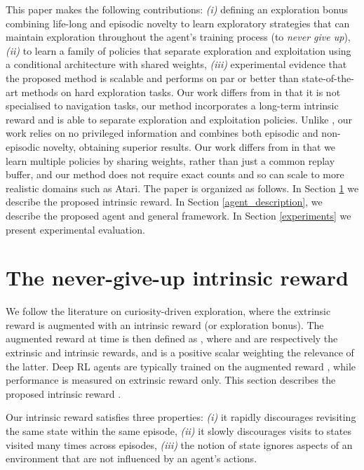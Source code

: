\documentclass{article} \usepackage{iclr2020_conference,times}
\begin{document}
This paper makes the following contributions: \emph{(i)} defining an exploration bonus combining life-long and episodic novelty to learn exploratory strategies that can maintain exploration throughout the agent's training process (to \emph{never give up}), \emph{(ii)} to learn a family of policies that separate exploration and exploitation using a conditional architecture with shared weights, \emph{(iii)} experimental evidence that the proposed method is scalable and performs on par or better than state-of-the-art methods on hard exploration tasks.
Our work differs from \citet{savinov2018episodic} in that it is not specialised to navigation tasks, our method incorporates a long-term intrinsic reward and is able to separate exploration and exploitation policies. Unlike \citet{stanton2018deep}, our work relies on no privileged information and combines both episodic and non-episodic novelty, obtaining superior results.
Our work differs from \citet{beyer2019mulex} in that we learn multiple policies by sharing weights, rather than just a common replay buffer, and our method does not require exact counts and so can scale to more realistic domains such as Atari.
The paper is organized as follows. In Section \ref{learning_exploratory} we describe the proposed intrinsic reward. In Section \ref{agent_description}, we describe the proposed agent and general framework. In Section \ref{experiments} we present experimental evaluation.

\section{The never-give-up intrinsic reward}
\label{learning_exploratory}
We follow the literature on curiosity-driven exploration, where the extrinsic reward is augmented with an intrinsic reward (or exploration bonus).
The augmented reward at time  is then defined as , where  and  are respectively the extrinsic and intrinsic rewards, and  is a positive scalar weighting the relevance of the latter.
Deep RL agents are typically trained on the augmented reward , while performance is measured on extrinsic reward  only.
This section describes the proposed intrinsic reward .

Our intrinsic reward  satisfies three properties: \emph{(i)} it rapidly discourages revisiting the same state within the same episode, \emph{(ii)} it slowly discourages visits to states visited many times across episodes, \emph{(iii)} the notion of state ignores aspects of an environment that are not influenced by an agent's actions.
\end{document}
